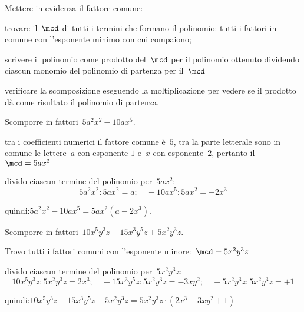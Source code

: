 \begin{procedura}
Mettere in evidenza il fattore comune:
\begin{enumeratea}
\item trovare il~\(\mcd\) di tutti i termini che formano il polinomio: tutti i 
 fattori in comune con l'esponente minimo con cui compaiono;
\item scrivere il polinomio come prodotto del~\(\mcd\) per il polinomio 
ottenuto 
 dividendo ciascun monomio del polinomio di partenza per il~\(\mcd\)
\item verificare la scomposizione eseguendo la moltiplicazione per vedere se 
 il prodotto dà come risultato il polinomio di partenza.
\end{enumeratea}
\end{procedura}

 \begin{esempio}
Scomporre in fattori~\(5a^{2}x^2-10ax^{5}\).
  \begin{enumeratea}
  \item tra i coefficienti numerici il fattore comune è~\(5\), 
   tra la parte letterale sono in comune le lettere~\(a\) con esponente \(1\) 
   e~\(x\) con esponente~\(2\), pertanto il~\(\mcd=5ax^2\)
 \item divido ciascun termine del polinomio per~\(5ax^2\):
 \[5a^{2}x^2:5ax^2=a; \quad -10ax^{5}:5ax^2=-2x^3\]
  \item quindi:\quad \(5a^{2}x^2-10ax^{5}=5ax^2(a-2x^3)\).
  \end{enumeratea}
 \end{esempio}

 \begin{esempio}
Scomporre in fattori~\(10x^{5}y^{3}z-15x^3y^{5}z+5x^2y^{3}z\).
 \begin{enumeratea}
 \item Trovo tutti i fattori comuni con l'esponente 
minore:~\(\mcd=5x^2y^{3}z\)
 \item divido ciascun termine del polinomio per~\(5x^2y^{3}z\):
\[10x^{5}y^{3}z:5x^2y^{3}z=2x^3; \quad
-15x^3y^{5}z:5x^2y^{3}z=-3xy^{2}; \quad
+5x^2y^{3}z:5x^2y^{3}z=+1\]
 \item quindi:\quad \(10x^{5}y^{3}z-15x^3y^{5}z+5x^2y^{3}z =
 5x^2y^{3}z \cdot (2x^3-3xy^{2}+1)\)
 \end{enumeratea}
 \end{esempio}

 
